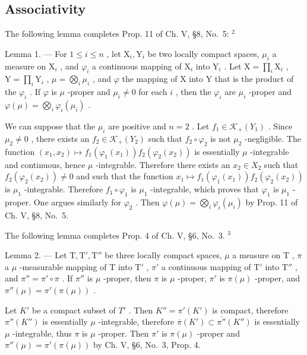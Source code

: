 \subsection{Associativity}

The following lemma completes Prop. 11 of Ch. V, §8, No.~5: \(^{2}\)

Lemma 1. --- For \(1 \leqslant i \leqslant n\) , let \(\mathrm{X}_i, \mathrm{Y}_i\) be two locally compact spaces, \(\mu_i\) a measure on \(\mathrm{X}_i\) , and \(\varphi_i\) a continuous mapping of \(\mathrm{X}_i\) into \(\mathrm{Y}_i\) . Let \(\mathrm{X} = \prod_i \mathrm{X}_i\) , \(\mathrm{Y} = \prod_i \mathrm{Y}_i\) , \(\mu = \bigotimes_i \mu_i\) , and \(\varphi\) the mapping of \(\mathrm{X}\) into \(\mathrm{Y}\) that is the product of the \(\varphi_i\) . If \(\varphi\) is \(\mu\) -proper and \(\mu_i \neq 0\) for each \(i\) , then the \(\varphi_i\) are \(\mu_i\) -proper and \(\varphi(\mu) = \bigotimes_i \varphi_i(\mu_i)\) .

We can suppose that the \(\mu_{i}\) are positive and \(n = 2\) . Let \(f_{1} \in \mathcal{K}_{+}(Y_{1})\) . Since \(\mu_{2} \neq 0\) , there exists an \(f_{2} \in \mathcal{K}_{+}(Y_{2})\) such that \(f_{2} \circ \varphi_{2}\) is not \(\mu_{2}\) -negligible. The function \((x_{1}, x_{2}) \mapsto f_{1}(\varphi_{1}(x_{1})) f_{2}(\varphi_{2}(x_{2}))\) is essentially \(\mu\) -integrable and continuous, hence \(\mu\) -integrable. Therefore there exists an \(x_{2} \in X_{2}\) such that \(f_{2}(\varphi_{2}(x_{2})) \neq 0\) and such that the function \(x_{1} \mapsto f_{1}(\varphi_{1}(x_{1})) f_{2}(\varphi_{2}(x_{2}))\) is \(\mu_{1}\) -integrable. Therefore \(f_{1} \circ \varphi_{1}\) is \(\mu_{1}\) -integrable, which proves that \(\varphi_{1}\) is \(\mu_{1}\) -proper. One argues similarly for \(\varphi_{2}\) . Then \(\varphi(\mu) = \bigotimes_{i} \varphi_{i}(\mu_{i})\) by Prop. 11 of Ch. V, §8, No.~5.

The following lemma completes Prop. 4 of Ch. V, §6, No.~3. \(^{3}\)

Lemma 2. --- Let \(\mathrm{T}, \mathrm{T}', \mathrm{T}''\) be three locally compact spaces, \(\mu\) a measure on \(\mathrm{T}\) , \(\pi\) a \(\mu\) -measurable mapping of \(\mathrm{T}\) into \(\mathrm{T}'\) , \(\pi'\) a continuous mapping of \(\mathrm{T}'\) into \(\mathrm{T}''\) , and \(\pi'' = \pi' \circ \pi\) . If \(\pi''\) is \(\mu\) -proper, then \(\pi\) is \(\mu\) -proper, \(\pi'\) is \(\pi(\mu)\) -proper, and \(\pi''(\mu) = \pi' (\pi(\mu))\) .

Let \(K'\) be a compact subset of \(T'\) . Then \(K'' = \pi'(K')\) is compact, therefore \(\pi''(K'')\) is essentially \(\mu\) -integrable, therefore \(\overline{\pi}(K') \subset \overline{\pi''}(K'')\) is essentially \(\mu\) -integrable, thus \(\pi\) is \(\mu\) -proper. Then \(\pi'\) is \(\pi(\mu)\) -proper and \(\pi''(\mu) = \pi'(\pi(\mu))\) by Ch. V, §6, No.~3, Prop. 4.

